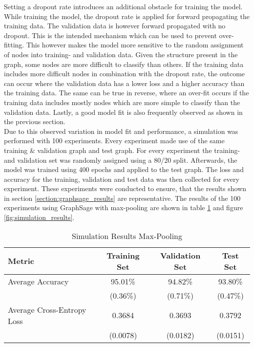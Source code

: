   \noindent Setting a dropout rate introduces an additional obstacle
  for training the model. While training the model, the dropout rate is
  applied for forward propagating the training data. The validation data is 
  however forward propagated with no dropout. This is the intended mechanism
  which can be used to prevent over-fitting. This however makes the model more
  sensitive to the random assignment of nodes into training- and validation
  data. Given the structure present in the graph, some nodes are more difficult
  to classify than others. If the training data includes more difficult nodes
  in combination with the dropout rate, the outcome can occur where the
  validation data has a lower loss and a higher accuracy than the training
  data. The same can be true in reverse, where an over-fit occurs if the
  training data includes mostly nodes which are more simple to classify than
  the validation data. Lastly, a good model fit is also frequently observed as
  shown in the previous section. \\

  \noindent Due to this observed variation in model fit and performance, a
  simulation was performed with 100 experiments. Every experiment made use of
  the same training \& validation graph and test graph. For every experiment
  the training- and validation set was randomly assigned using a 80/20 split.
  Afterwards, the model was trained using 400 epochs and applied to the
  test graph. The loss and accuracy for the training, validation and test data
  was then collected for every experiment. These experiments were conducted to
  ensure, that the results shown in section \ref{section:graphsage_results} are
  representative. The results of the 100 experiments using GraphSage with
  max-pooling are shown in table \ref{table:simulation_results} and figure 
  \ref{fig:simulation_results}. 

  \begin{table}[h]
    \centering
      \begin{tabular}{|l||c|c|c|}
      \hline
      \textbf{Metric} & \textbf{Training Set} & \textbf{Validation Set} & 
      \textbf{Test Set}\\
      \hline\hline
      Average Accuracy & 95.01\% & 94.82\% & 93.80\% \\\hline 
                       & (0.36\%) & (0.71\%) & (0.47\%) \\\hline
      Average Cross-Entropy Loss & 0.3684 & 0.3693 & 0.3792 \\\hline
                                 & (0.0078) & (0.0182) & (0.0151) \\
      \hline
    \end{tabular}
    \caption{Simulation Results Max-Pooling}
    \label{table:simulation_results}
  \end{table}

